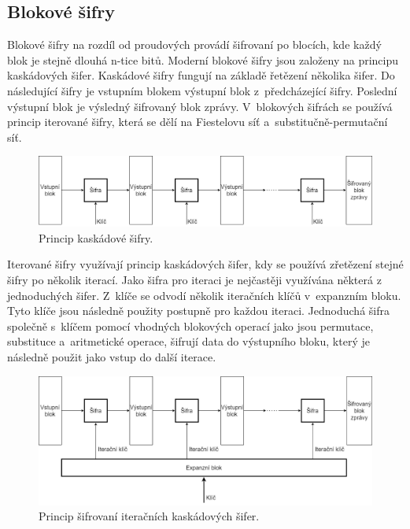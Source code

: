 \subsection{Blokové šifry \label{subsec:blockFunction}}%
Blokové šifry na rozdíl od proudových provádí šifrovaní po blocích, kde každý blok je stejně dlouhá n-tice bitů. Moderní blokové šifry jsou založeny na principu kaskádových šifer. Kaskádové šifry fungují na základě řetězení několika šifer. Do následující šifry je vstupním blokem výstupní blok z~předcházející šifry. Poslední výstupní blok je výsledný šifrovaný blok zprávy. V~blokových šifrách se používá princip iterované šifry, která se dělí na Fiestelovu síť a~substitučně-permutační síť.\cite{Burda9788021446120ISBN}
\begin{figure}[!h]
  \begin{center}
    \includegraphics[scale=0.3]{obrazky/cascadeCipher.png}
  \end{center}
  \caption[Kaskádová šifra]{Princip kaskádové šifry.\cite{Burda9788021446120ISBN}}
  \label{img:CascadeCipher}
\end{figure}

Iterované šifry využívají princip kaskádových šifer, kdy se používá zřetězení stejné šifry po několik iterací. Jako šifra pro iteraci je nejčastěji využívána některá z jednoduchých šifer. Z~klíče se odvodí několik iteračních klíčů v~expanzním bloku. Tyto klíče jsou následně použity postupně pro každou iteraci. Jednoduchá šifra společně s~klíčem pomocí vhodných blokových operací jako jsou permutace, substituce a~aritmetické operace, šifrují data do výstupního bloku, který je následně použit jako vstup do další iterace.\cite{Burda9788021446120ISBN}
\begin{figure}[!h]
  \begin{center}
    \includegraphics[scale=0.3]{obrazky/IterateCipher.png}
  \end{center}
  \caption[Iterační kaskádová šifra]{Princip šifrovaní iteračních kaskádových šifer.\cite{Burda9788021446120ISBN}}
  \label{img:iterateCipher}
\end{figure}

